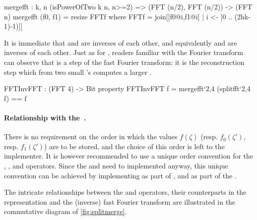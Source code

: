 \begin{code}
  mergefft : {k, n} (isPowerOfTwo k n, n>=2) =>
    (FFT (n/2), FFT (n/2)) -> (FFT n)
  mergefft (f0, f1) = resize FFTf where
    FFTf = join[[f0@i,f1@i] | i <- [0 .. (2^^(k-1)-1)]]
\end{code}

 It is immediate that \polsplit and \polmerge are inverses of each other, and equivalently \splitfft and \mergefft are inverses of each other. Just as for \splitfft, readers familiar with the Fourier transform can observe that \mergefft is a step of the fast Fourier transform: it is the reconstruction step which from two small \fft's computes a larger \fft.

\begin{code}
  FFTInvFFT : (FFT 4) -> Bit
  property FFTInvFFT f = mergefft`{2,4} (splitfft`{2,4} f) == f
\end{code}

 \paragraph{Relationship with the \fft.} There is no requirement on the order in which the values $f(\zeta)$ (resp. $f_0(\zeta')$, resp. $f_1(\zeta')$) are to be stored, and the choice of this order is left to the implementer. It is however recommended to use a unique order convention for the \fft, \ifft, \splitfft and \mergefft operators. Since the \fft and \ifft need to implemented anyway, this unique convention can be achieved \eg by implementing \splitfft as part of \ifft, and \mergefft as part of the \fft.


 The intricate relationships between the \polsplit and \polmerge operators, their counterparts in the \fft representation and the (inverse) fast Fourier transform are illustrated in the commutative diagram of \cref{fig:splitmerge}.

